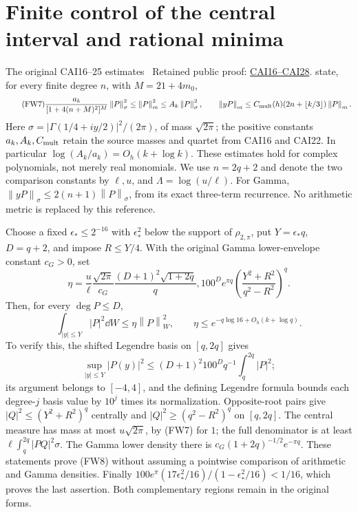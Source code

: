 \documentclass[11pt]{article}
\newcommand{\norm}[1]{\left\lVert#1\right\rVert}
\begin{document}
\section{Finite control of the central interval and rational minima}
The original CAI16--25 estimates \cite{cai}%
~Retained public proof: \href{https://github.com/KokunoYumeto/zeta-function-research-reader/blob/689a8f87e9c12b7a99b01b3123438c6751ee608f/workbenches/splitzero-tandem/continuations/20260919-full-window-source-products/providers/CAI_COMPLETE_PREREQUISITE.tex\#L284}{CAI16--CAI28}.%
{} state, for every finite degree
$n$, with $M=21+4m_0$,
\begin{equation}\tag{FW7}
 \frac{a_k}{[1+4(n+M)^2]^M}\norm P_\sigma^2
 \le\norm P_m^2\le A_k\norm P_\sigma^2,
 \qquad \norm{yP}_m\le C_{\rm mult}(h)(2n+\lfloor k/3\rfloor)\norm P_m.
\end{equation}
Here $\sigma=|\Gamma(1/4+iy/2)|^2/(2\pi)$, of mass $\sqrt{2\pi}$;
the positive constants $a_k,A_k,C_{\rm mult}$ retain the source masses
and quartet from CAI16 and CAI22. In particular
$\log(A_k/a_k)=O_h(k+\log k)$. These estimates hold for complex
polynomials, not merely real monomials. We use $n=2q+2$ and denote the
two comparison constants by $\ell,u$, and $\Lambda=\log(u/\ell)$.
For Gamma, $\norm{yP}_\sigma\le2(n+1)\norm P_\sigma$, from its exact
three-term recurrence. No arithmetic metric is replaced by this reference.

Choose a fixed $\epsilon_*\le2^{-16}$ with $\epsilon_*^2$ below the
support of $\rho_{2,\pi}$, put $Y=\epsilon_*q$, $D=q+2$, and impose
$R\le Y/4$. With the original Gamma lower-envelope constant $c_G>0$,
set
\begin{equation}\tag{FW8}
 \eta=\frac{u}{\ell}\frac{\sqrt{2\pi}}{c_G}
 \frac{(D+1)^2\sqrt{1+2q}}q,100^D e^{\pi q}
 \left(\frac{Y^2+R^2}{q^2-R^2}\right)^q.
\end{equation}
Then, for every $\deg P\le D$,
\begin{equation}\tag{FW9}
 \int_{|y|\le Y}|P|^2\dd W\le\eta\norm P_W^2,
 \qquad \eta\le e^{-q\log16+O_h(k+\log q)}.
\end{equation}
To verify this, the shifted Legendre basis on $[q,2q]$ gives
\[
 \sup_{|y|\le Y}|P(y)|^2\le (D+1)^2 100^Dq^{-1}\int_q^{2q}|P|^2;
\]
its argument belongs to $[-4,4]$, and the defining Legendre formula
bounds each degree-$j$ basis value by $10^j$ times its normalization.
Opposite-root pairs give $|Q|^2\le(Y^2+R^2)^q$ centrally and
$|Q|^2\ge(q^2-R^2)^q$ on $[q,2q]$. The central measure has mass at
most $u\sqrt{2\pi}$, by (FW7) for $1$; the full denominator is at
least $\ell\int_q^{2q}|PQ|^2\sigma$. The Gamma lower density there
is $c_G(1+2q)^{-1/2}e^{-\pi q}$. These statements prove (FW8) without
assuming a pointwise comparison of arithmetic and Gamma densities.
Finally $100e^\pi(17\epsilon_*^2/16)/(1-\epsilon_*^2/16)<1/16$,
which proves the last assertion. Both complementary regions remain in
the original forms.
\end{document}
